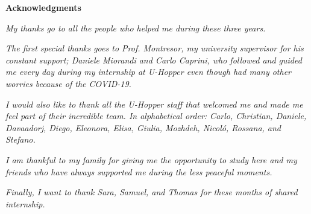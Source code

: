 \thispagestyle{empty}

\begin{center}
    {\bf \Huge Acknowledgments}
\end{center}

\vspace{4cm}

\emph{My thanks go to all the people who helped me during these three years.}

\emph{The first special thanks goes to Prof. Montresor, my university supervisor for his constant support; Daniele Miorandi and Carlo Caprini, who followed and guided me every day during my internship at U-Hopper even though had many other worries because of the COVID-19.}

\emph{I would also like to thank all the U-Hopper staff that welcomed me and made me feel part of their incredible team. In alphabetical order: Carlo, Christian, Daniele, Davaadorj, Diego, Eleonora, Elisa, Giulia, Mozhdeh, Nicol\'o, Rossana, and Stefano.}

\emph{I am thankful to my family for giving me the opportunity to study here and my friends who have always supported me during the less peaceful moments.}

\emph{Finally, I want to thank Sara, Samuel, and Thomas for these months of shared internship.}